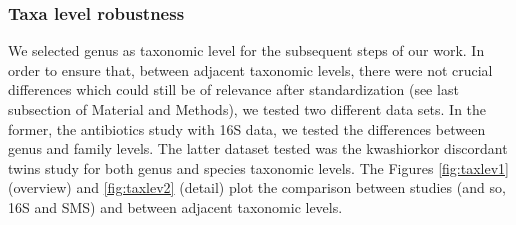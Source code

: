 \subsubsection*{Taxa level robustness}
We selected genus as taxonomic level for the subsequent steps of our work. In order to ensure that, between adjacent taxonomic levels, there were not crucial differences which could still be of relevance after standardization (see last subsection of Material and Methods), we tested two different data sets. In the former, the antibiotics study\cite{antibiotic} with 16S data, we tested the differences between genus and family levels. The latter dataset tested was the kwashiorkor discordant twins study\cite{kwashiorkor} for both genus and species taxonomic levels. The Figures \ref{fig:taxlev1} (overview) and \ref{fig:taxlev2} (detail) plot the comparison between studies (and so, 16S and SMS) and between adjacent taxonomic levels.

